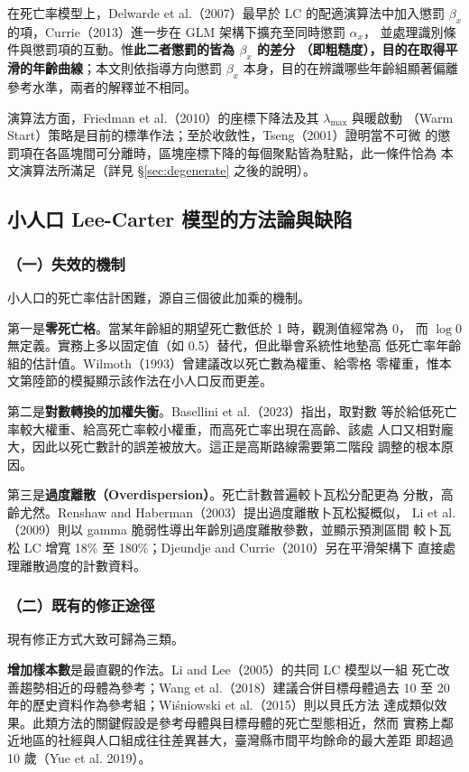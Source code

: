 \documentclass[UTF8, fontset=macnew, a4paper, 12pt]{ctexart}
\begin{document}
在死亡率模型上，Delwarde et al.（2007）最早於 LC 的配適演算法中加入懲罰
$\beta_x$ 的項，Currie（2013）進一步在 GLM 架構下擴充至同時懲罰 $\alpha_x$，
並處理識別條件與懲罰項的互動。惟\textbf{此二者懲罰的皆為 $\beta_x$ 的差分
（即粗糙度），目的在取得平滑的年齡曲線}；本文則依指導方向懲罰 $\beta_x$
本身，目的在辨識哪些年齡組顯著偏離參考水準，兩者的解釋並不相同。

演算法方面，Friedman et al.（2010）的座標下降法及其 $\lambda_{\max}$ 與暖啟動
（Warm Start）策略是目前的標準作法；至於收斂性，Tseng（2001）證明當不可微
的懲罰項在各區塊間可分離時，區塊座標下降的每個聚點皆為駐點，此一條件恰為
本文演算法所滿足（詳見 \S\ref{sec:degenerate} 之後的說明）。

\subsection{小人口 Lee-Carter 模型的方法論與缺陷}

\subsubsection{（一）失效的機制}

小人口的死亡率估計困難，源自三個彼此加乘的機制。

第一是\textbf{零死亡格}。當某年齡組的期望死亡數低於 1 時，觀測值經常為 0，
而 $\log 0$ 無定義。實務上多以固定值（如 0.5）替代，但此舉會系統性地墊高
低死亡率年齡組的估計值。Wilmoth（1993）曾建議改以死亡數為權重、給零格
零權重，惟本文第陸節的模擬顯示該作法在小人口反而更差。

第二是\textbf{對數轉換的加權失衡}。Basellini et al.（2023）指出，取對數
等於給低死亡率較大權重、給高死亡率較小權重，而高死亡率出現在高齡、該處
人口又相對龐大，因此以死亡數計的誤差被放大。這正是高斯路線需要第二階段
調整的根本原因。

第三是\textbf{過度離散（Overdispersion）}。死亡計數普遍較卜瓦松分配更為
分散，高齡尤然。Renshaw and Haberman（2003）提出過度離散卜瓦松擬概似，
Li et al.（2009）則以 gamma 脆弱性導出年齡別過度離散參數，並顯示預測區間
較卜瓦松 LC 增寬 18\% 至 180\%；Djeundje and Currie（2010）另在平滑架構下
直接處理離散過度的計數資料。

\subsubsection{（二）既有的修正途徑}

現有修正方式大致可歸為三類。

\textbf{增加樣本數}是最直觀的作法。Li and Lee（2005）的共同 LC 模型以一組
死亡改善趨勢相近的母體為參考；Wang et al.（2018）建議合併目標母體過去
10 至 20 年的歷史資料作為參考組；Wiśniowski et al.（2015）則以貝氏方法
達成類似效果。此類方法的關鍵假設是參考母體與目標母體的死亡型態相近，然而
實務上鄰近地區的社經與人口組成往往差異甚大，臺灣縣市間平均餘命的最大差距
即超過 10 歲（Yue et al. 2019）。
\end{document}
